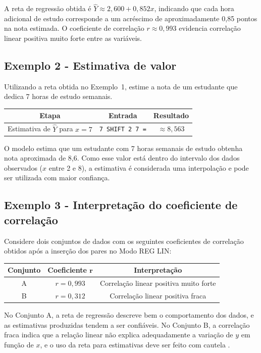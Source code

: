 A reta de regressão obtida é $\hat{Y} \approx 2{,}600 + 0{,}852x$, indicando que cada hora adicional de estudo corresponde a um acréscimo de aproximadamente 0,85 pontos na nota estimada. O coeficiente de correlação $r \approx 0{,}993$ evidencia correlação linear positiva muito forte entre as variáveis.

\subsection*{Exemplo 2 - Estimativa de valor}

Utilizando a reta obtida no Exemplo~1, estime a nota de um estudante que dedica 7 horas de estudo semanais.

\begin{table}[H]
    \centering
    \begin{tabular}{|c|c|c|}
        \hline
        \textbf{Etapa} & \textbf{Entrada} & \textbf{Resultado} \\ \hline
        Estimativa de $\hat{Y}$ para $x = 7$ & \texttt{7 SHIFT 2 7 =} & $\approx 8{,}563$ \\ \hline
    \end{tabular}
\end{table}

O modelo estima que um estudante com 7 horas semanais de estudo obtenha nota aproximada de 8,6. Como esse valor está dentro do intervalo dos dados observados ($x$ entre 2 e 8), a estimativa é considerada uma interpolação e pode ser utilizada com maior confiança.

\subsection*{Exemplo 3 - Interpretação do coeficiente de correlação}

Considere dois conjuntos de dados com os seguintes coeficientes de correlação obtidos após a inserção dos pares no Modo REG LIN:

\begin{table}[H]
    \centering
    \begin{tabular}{|c|c|c|}
        \hline
        \textbf{Conjunto} & \textbf{Coeficiente $\boldsymbol{r}$} & \textbf{Interpretação} \\ \hline
        A & $r = 0{,}993$ & Correlação linear positiva muito forte \\
        B & $r = 0{,}312$ & Correlação linear positiva fraca \\ \hline
    \end{tabular}
\end{table}

No Conjunto A, a reta de regressão descreve bem o comportamento dos dados, e as estimativas produzidas tendem a ser confiáveis. No Conjunto B, a correlação fraca indica que a relação linear não explica adequadamente a variação de $y$ em função de $x$, e o uso da reta para estimativas deve ser feito com cautela \cite{crespo2009}.